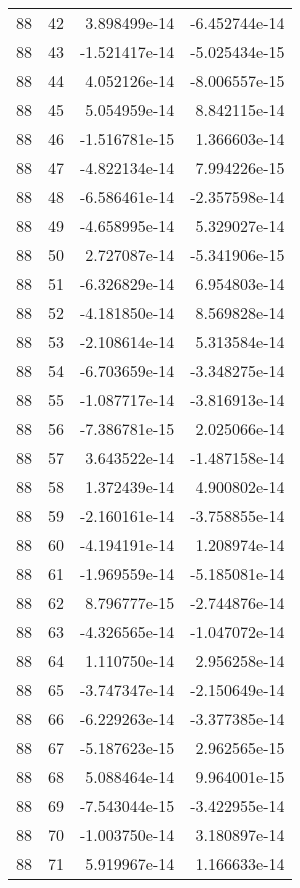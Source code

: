 \begin{tabular}{rrrr}
  88 &   42 &  3.898499e-14 & -6.452744e-14 \\
  88 &   43 & -1.521417e-14 & -5.025434e-15 \\
  88 &   44 &  4.052126e-14 & -8.006557e-15 \\
  88 &   45 &  5.054959e-14 &  8.842115e-14 \\
  88 &   46 & -1.516781e-15 &  1.366603e-14 \\
  88 &   47 & -4.822134e-14 &  7.994226e-15 \\
  88 &   48 & -6.586461e-14 & -2.357598e-14 \\
  88 &   49 & -4.658995e-14 &  5.329027e-14 \\
  88 &   50 &  2.727087e-14 & -5.341906e-15 \\
  88 &   51 & -6.326829e-14 &  6.954803e-14 \\
  88 &   52 & -4.181850e-14 &  8.569828e-14 \\
  88 &   53 & -2.108614e-14 &  5.313584e-14 \\
  88 &   54 & -6.703659e-14 & -3.348275e-14 \\
  88 &   55 & -1.087717e-14 & -3.816913e-14 \\
  88 &   56 & -7.386781e-15 &  2.025066e-14 \\
  88 &   57 &  3.643522e-14 & -1.487158e-14 \\
  88 &   58 &  1.372439e-14 &  4.900802e-14 \\
  88 &   59 & -2.160161e-14 & -3.758855e-14 \\
  88 &   60 & -4.194191e-14 &  1.208974e-14 \\
  88 &   61 & -1.969559e-14 & -5.185081e-14 \\
  88 &   62 &  8.796777e-15 & -2.744876e-14 \\
  88 &   63 & -4.326565e-14 & -1.047072e-14 \\
  88 &   64 &  1.110750e-14 &  2.956258e-14 \\
  88 &   65 & -3.747347e-14 & -2.150649e-14 \\
  88 &   66 & -6.229263e-14 & -3.377385e-14 \\
  88 &   67 & -5.187623e-15 &  2.962565e-15 \\
  88 &   68 &  5.088464e-14 &  9.964001e-15 \\
  88 &   69 & -7.543044e-15 & -3.422955e-14 \\
  88 &   70 & -1.003750e-14 &  3.180897e-14 \\
  88 &   71 &  5.919967e-14 &  1.166633e-14 \\

\end{tabular}
